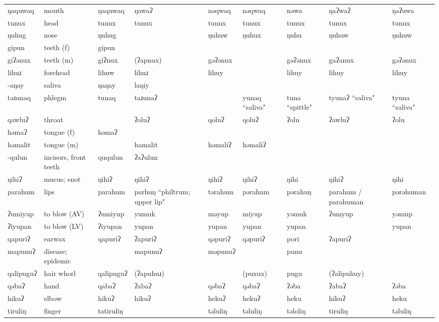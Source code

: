 \begin{landscape}
\begin{longtable}{*{9}{p{}}}
\text{*}ŋaquwaq & mouth & ŋaquwaq & ŋawaʔ & nəqwaq & nəqwaq & nəwa & ŋaʔwaʔ & ŋəʔuwa\\
\text{*}tunux & head & tunux & tunux & tunux & tunux & tunux & tunux & tunux\\
\text{*}ŋuhug & nose & ŋuhug &  & ŋuhuw & ŋuhux & ŋuhu & ŋuhuw & ŋuhuw\\
\text{*}gipun & teeth (f) & gipun &  &  &  &  &  & \\
\text{*}giʔənux & teeth (m) & giʔnux & (ʔapnux) & gəʔənux &  & gəʔənux & gaʔanux & gəʔənux\\
\text{*}lihuɹ & forehead & lihuw & lihuɹ & lihuy &  & lihuy & lihuy & lihuy\\
\text{*}-aŋay & saliva & ŋaŋay & laŋiy &  &  &  &  & \\
\text{*}təɹunaq & phlegm & tunaq & taɹunaʔ &  & yunaq ``saliva" & tuna ``spittle" & tyunaʔ ``saliva" & tyuna ``saliva"\\
\text{*}qawluʔ & throat &  & ʔoluʔ & qoluʔ & qoluʔ & ʔolu & ʔawluʔ & ʔolu\\
\text{*}həmaʔ & tongue (f) & həmaʔ &  &  &  &  &  & \\
\text{*}həmalit & tongue (m) &  & hamalit & həmaliʔ & həmaliʔ &  &  & \\
\text{*}-qulun & incisors, front teeth & ququlun & ʔaʔulun &  &  &  &  & \\
\text{*}ŋihiʔ & mucus; snot & ŋihiʔ & ŋihiʔ & ŋihiʔ & ŋihiʔ & ŋihi & ŋihiʔ & ŋihi\\
\text{*}parahum & lips & parahum & parhuŋ ``philtrum; upper lip" & tərahum & pərahum & pərahuŋ & parahum / parahuman & pərəhuman\\
\text{*}ʔumiyup & to blow (AV) & ʔumiyup & yumuk & məyup & miyup & yəmuk & ʔumyup & yəmup\\
\text{*}ʔiyupan & to blow (LV) & ʔiyupan & yupan & yupan & yupan & yupan &  & yupan\\
\text{*}qapuriʔ & earwax & qapuriʔ & ʔapuriʔ & qəpuriʔ & qəpuriʔ & pori & ʔapuriʔ & \\
\text{*}mapunuʔ & disease; epidemic &  & mapunuʔ & məpunuʔ &  & punu &  & \\
\text{*}qalipuguʔ & hair whorl & qalipuguʔ & (ʔapuhuɹ) &  & (puxux) & pugu & (ʔalipuhuy) & \\
\text{*}qəbaʔ & hand & qabaʔ & ʔabaʔ & qəbaʔ & qəbaʔ & ʔəba & ʔabaʔ & ʔəba\\
\text{*}hikuʔ & elbow & hikuʔ & hikuʔ & hekuʔ & hekuʔ & heku & hikuʔ & heku\\
\text{*}tiruliŋ & finger & tatiruliŋ &  & təluliŋ & təluliŋ & təloliŋ & tiruliŋ & təluliŋ\\

\end{longtable}
\end{landscape}
